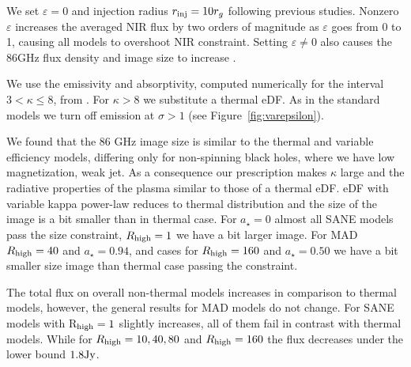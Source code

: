 We set $\varepsilon=0$ and injection radius $r_{\rm inj}=10r_{g}$ following previous studies.  Nonzero $\varepsilon$ increases the averaged NIR flux by two orders of magnitude as $\varepsilon$ goes from 0 to 1, causing all models to overshoot NIR constraint.  Setting $\varepsilon \ne 0$ also causes the 86GHz flux density and image size to increase \citep{2021arXiv211102518F}.

We use the emissivity and absorptivity, computed numerically for the interval $3 < \kappa \le 8$, from  \cite{2016ApJ...822...34P}. For $\kappa > 8$ we substitute a thermal eDF.  As in the standard models we turn off emission at $\sigma > 1$ (see Figure~\ref{fig:varepsilon}).




We found that the 86 GHz image size is similar to the thermal and variable efficiency models, differing only for non-spinning black holes, where we have low magnetization, weak jet. As a consequence our prescription makes $\kappa$ large and the radiative properties of the plasma similar to those of a thermal eDF.
eDF with variable kappa power-law reduces to thermal distribution and the size of the image is a bit smaller than in thermal case. For $a_{\star}=0$ almost all SANE models pass the size constraint, $R_{\rm high}=1$ we have a bit larger image. For MAD $R_{\rm high}=40$ and $a_{\star}=0.94$, and cases for $R_{\rm high}=160$ and $a_{\star}=0.50$ we have a bit smaller size image than thermal case passing the constraint.


The total flux on overall non-thermal models increases in comparison to thermal models, however, the general results for MAD models do not change. For SANE models with R$_{\rm high}=1$ slightly increases, all of them fail in contrast with thermal models. While for $R_{\rm high}=10,40,80$ and $R_{\rm high}=160$ the flux decreases under the lower bound $1.8 \rm {Jy}$.


